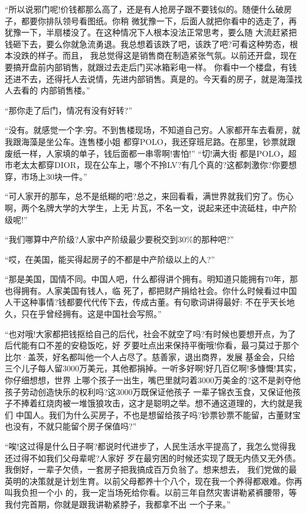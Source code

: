 \documentclass[11pt,a4paper,onecolumn]{article}
\begin{document}
``所以说邪门呢!价钱都那么高了，还是有人抢房子跟不要钱似的。随便什么破房子，都要你排队领号看图纸。你稍
微犹豫一下，后面人就把你看中的选走了，再犹豫一下，半扇楼没了。在这种情况下人根本没法正常思考，要么随
大流赶紧把钱砸下去，要么你就急流勇退。我总想着该跌了吧，该跌了吧?可看这种势态，根本没跌的样子。而且，
我总觉得这是销售商在制造紧张气氛。以前还开盘，现在要搞开盘前内部销售，就跟过去走后门买冰箱彩电一样。
你看中一个楼盘，有钱还进不去，还得托人去说情，先进内部销售。真是的。今天看的房子，就是海藻找人去看的
内部销售楼。''

``那你走了后门，情况有没有好转?''

``没有。就感觉一个字:穷。不到售楼现场，不知道自己穷。人家都开车去看房，就我跟海藻是坐公车。连售楼小姐
都穿POLO，我还穿班尼路。在那里，钞票就跟废纸一样，人家填的单子，钱后面都一串零啊!害怕!'' ``切!满大街
都是POLO，超市老太太都穿DIOR，现在公车上，哪个不拎LV?有几个真的?这都刺激你?你要想穿，市场上30块一件。''

``可人家开的那车，总不是纸糊的吧?总之，来回看看，满世界就我们穷了。伤心啊，两个名牌大学的大学生，上无
片瓦，不名一文，说起来还中流砥柱，中产阶级呢!''

``我们哪算中产阶级?人家中产阶级最少要税交到30\%的那种吧?''

``哎，在美国，能买得起房子的不都是中产阶级以上的人?''

``那是美国，国情不同。中国人吧，什么都得讲个拥有。明知道只能拥有70年，那也得拥有。人家美国有钱人，临
死了，都把财产捐给社会。你什么时候看过中国人干这种事情?钱都要代代传下去，传成古董。有句歌词讲得最好:
不在乎天长地久，只在乎曾经拥有。这是中国社会写照。''

``也对哦!大家都把钱抠给自己的后代，社会不就空了吗?有时候也要想开点，为了后代能有口不差的安稳饭吃，好
歹要吐点出来保持平衡哦!你看，最刁莫过于那个比尔·盖茨，好名都叫他一个人占尽了。慈善家，退出商界，发展
基金会，只给三个儿子每人留3000万美元，其他都捐掉。一听多好啊!好几百亿啊!多慷慨!其实，你仔细想想，世界
上哪个孩子一出生，嘴巴里就叼着3000万美金的?这不是剥夺他孩子劳动创造快乐的权利吗?这3000万既保证他孩子
一辈子锦衣玉食，又保证他孩子不捧着红烧肉被一堆饿狼攻击，这才是聪明之举。想不通这道理的，大约就是我们
中国人。我们为什么买房子，不也是想留给孩子吗?钞票钞票不能留，古董财宝也没有，不就只能留个房子保值吗?''

``唉!这过得是什么日子啊?都说时代进步了，人民生活水平提高了，我怎么觉得我还过得不如我们父母辈呢?人家好
歹在最穷困的时候还实现了既无内债又无外债。我倒好，一辈子欠债，一套房子把我搞成百万负翁了。想来想去，
我们党做的最英明的决策就是计划生育。以前父母都养十个八个，现在我一个养得都艰难。你再叫我负担一个小
的，我一定当场死给你看。以前三年自然灾害讲勒紧裤腰带，等我付完首期，你就是跟我讲勒紧脖子，我都拿不出
一个子来。''
\end{document}
